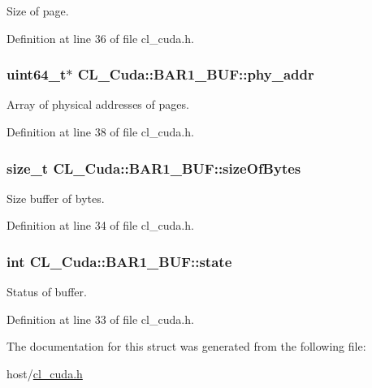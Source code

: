 Size of page. 

Definition at line 36 of file cl\_\-cuda.h.\hypertarget{structCL__Cuda_1_1BAR1__BUF_a0f74a0b65b2f431fa03a573002ca0d2f}{
\subsubsection[{phy\_\-addr}]{\setlength{\rightskip}{0pt plus 5cm}uint64\_\-t$\ast$ {\bf CL\_\-Cuda::BAR1\_\-BUF::phy\_\-addr}}}
\label{structCL__Cuda_1_1BAR1__BUF_a0f74a0b65b2f431fa03a573002ca0d2f}


Array of physical addresses of pages. 

Definition at line 38 of file cl\_\-cuda.h.\hypertarget{structCL__Cuda_1_1BAR1__BUF_a9919f6ce31f58f31e93552171e1de5ea}{
\subsubsection[{sizeOfBytes}]{\setlength{\rightskip}{0pt plus 5cm}size\_\-t {\bf CL\_\-Cuda::BAR1\_\-BUF::sizeOfBytes}}}
\label{structCL__Cuda_1_1BAR1__BUF_a9919f6ce31f58f31e93552171e1de5ea}


Size buffer of bytes. 

Definition at line 34 of file cl\_\-cuda.h.\hypertarget{structCL__Cuda_1_1BAR1__BUF_a3290eaf7a39a6f8ed79829ec1b62801a}{
\subsubsection[{state}]{\setlength{\rightskip}{0pt plus 5cm}int {\bf CL\_\-Cuda::BAR1\_\-BUF::state}}}
\label{structCL__Cuda_1_1BAR1__BUF_a3290eaf7a39a6f8ed79829ec1b62801a}


Status of buffer. 

Definition at line 33 of file cl\_\-cuda.h.

The documentation for this struct was generated from the following file:\begin{DoxyCompactItemize}
\item 
host/\hyperlink{cl__cuda_8h}{cl\_\-cuda.h}\end{DoxyCompactItemize}
